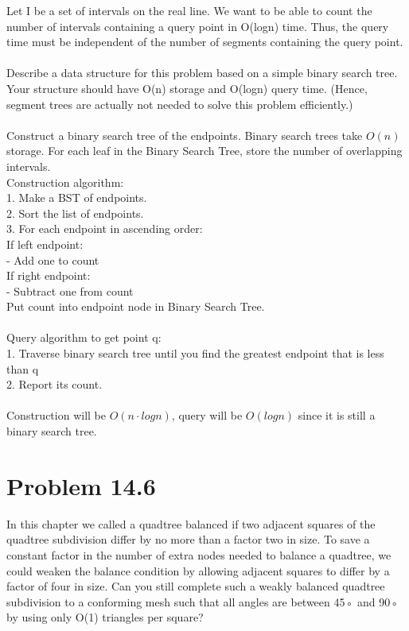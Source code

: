 \documentclass[11pt,psfig]{article}
\begin{document}
Let I be a set of intervals on the real line. We want to be able to count the
number of intervals containing a query point in O(logn) time. Thus, the
query time must be independent of the number of segments containing
the query point.\\
\\
Describe a data structure for this problem based on a simple binary
search tree. Your structure should have O(n) storage and O(logn)
query time. (Hence, segment trees are actually not needed to solve
this problem efficiently.)\\
\\
Construct a binary search tree of the endpoints. Binary search trees take $O(n)$ storage. For each leaf in the Binary Search Tree, store the number of overlapping intervals. \\
Construction algorithm:\\
1. Make a BST of endpoints. \\
2. Sort the list of endpoints. \\
3. For each endpoint in ascending order:\\
If left endpoint: \\
- Add one to count\\
If right endpoint: \\
- Subtract one from count\\
Put count into endpoint node in Binary Search Tree. \\
\\
Query algorithm to get point q:\\
1. Traverse binary search tree until you find the greatest endpoint that is less than q\\
2. Report its count. \\
\\
Construction will be $O(n \cdot logn)$, query will be $O(logn)$ since it is still a binary search tree. 

\section*{Problem 14.6}

In this chapter we called a quadtree balanced if two adjacent squares of
the quadtree subdivision differ by no more than a factor two in size. To
save a constant factor in the number of extra nodes needed to balance a
quadtree, we could weaken the balance condition by allowing adjacent
squares to differ by a factor of four in size. Can you still complete such
a weakly balanced quadtree subdivision to a conforming mesh such that
all angles are between 45◦ and 90◦ by using only O(1) triangles per
square?
\end{document}
